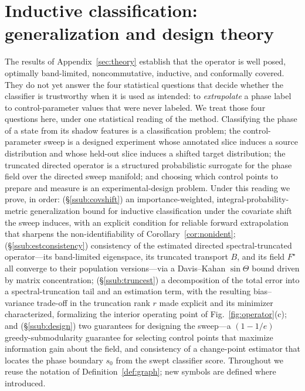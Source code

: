 \documentclass[aps,prresearch,reprint,amsmath,amssymb,nofootinbib,superscriptaddress,floatfix]{revtex4-2}
\theoremstyle{definition}
\theoremstyle{remark}
\theoremstyle{plain}
\begin{document}
\section{Inductive classification: generalization and design theory}
\label{sec:inductive-theory}
The results of Appendix~\ref{sec:theory} establish that the operator is well posed, optimally band-limited,
noncommutative, inductive, and conformally covered. They do not yet answer the four statistical questions
that decide whether the classifier is trustworthy when it is used as intended: to \emph{extrapolate} a phase
label to control-parameter values that were never labeled. We treat those four questions here, under one
statistical reading of the method. Classifying the phase of a state from its shadow features is a
classification problem; the control-parameter sweep is a designed experiment whose annotated slice induces a
source distribution and whose held-out slice induces a shifted target distribution; the truncated directed
operator is a structured probabilistic surrogate for the phase field over the directed sweep manifold; and
choosing which control points to prepare and measure is an experimental-design problem. Under this reading we
prove, in order: (\S\ref{ssub:covshift}) an importance-weighted, integral-probability-metric generalization
bound for inductive classification under the covariate shift the sweep induces, with an explicit condition
for reliable forward extrapolation that sharpens the non-identifiability of
Corollary~\ref{cor:nonident}; (\S\ref{ssub:estconsistency}) consistency of the estimated directed
spectral-truncated operator---its band-limited eigenspace, its truncated transport $B$, and its field
$F^\star$ all converge to their population versions---via a Davis--Kahan $\sin\Theta$ bound driven by matrix
concentration; (\S\ref{ssub:truncest}) a decomposition of the total error into a spectral-truncation tail and
an estimation term, with the resulting bias--variance trade-off in the truncation rank $r$ made explicit and
its minimizer characterized, formalizing the interior operating point of Fig.~\ref{fig:operator}(c); and
(\S\ref{ssub:design}) two guarantees for designing the sweep---a $(1-1/e)$ greedy-submodularity guarantee for
selecting control points that maximize information gain about the field, and consistency of a change-point
estimator that locates the phase boundary $s_0$ from the swept classifier score. Throughout we reuse the
notation of Definition~\ref{def:graph}; new symbols are defined where introduced.
\end{document}
